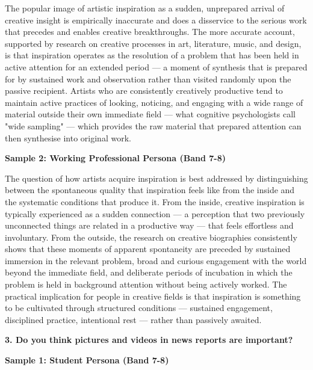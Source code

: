 The popular image of artistic inspiration as a sudden, unprepared arrival of creative insight is empirically inaccurate and does a disservice to the serious work that precedes and enables creative breakthroughs. The more accurate account, supported by research on creative processes in art, literature, music, and design, is that inspiration operates as the resolution of a problem that has been held in active attention for an extended period — a moment of synthesis that is prepared for by sustained work and observation rather than visited randomly upon the passive recipient. Artists who are consistently creatively productive tend to maintain active practices of looking, noticing, and engaging with a wide range of material outside their own immediate field — what cognitive psychologists call "wide sampling" — which provides the raw material that prepared attention can then synthesise into original work.

\textbf{Sample 2: Working Professional Persona (Band 7-8)}

The question of how artists acquire inspiration is best addressed by distinguishing between the spontaneous quality that inspiration feels like from the inside and the systematic conditions that produce it. From the inside, creative inspiration is typically experienced as a sudden connection — a perception that two previously unconnected things are related in a productive way — that feels effortless and involuntary. From the outside, the research on creative biographies consistently shows that these moments of apparent spontaneity are preceded by sustained immersion in the relevant problem, broad and curious engagement with the world beyond the immediate field, and deliberate periods of incubation in which the problem is held in background attention without being actively worked. The practical implication for people in creative fields is that inspiration is something to be cultivated through structured conditions — sustained engagement, disciplined practice, intentional rest — rather than passively awaited.

\separator

\begin{ieltsquestion}
\textbf{3. Do you think pictures and videos in news reports are important?}
\end{ieltsquestion}
\textbf{Sample 1: Student Persona (Band 7-8)}

